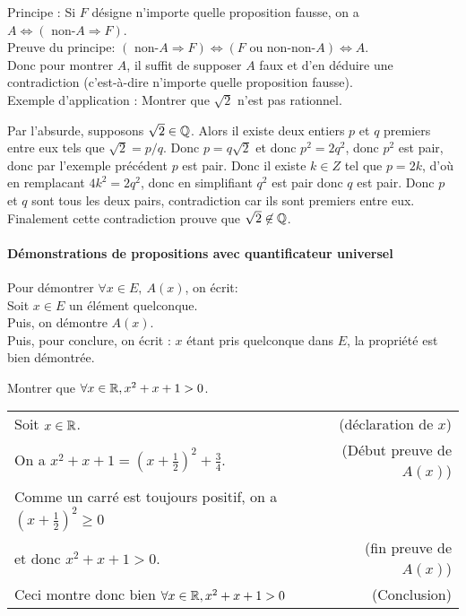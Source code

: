 {Principe : Si $F$ désigne n'importe quelle proposition fausse, on a $A \Leftrightarrow (\text{ non-}A \Rightarrow F)$.\\
Preuve du principe: $(\text{ non-}A \Rightarrow F) \Leftrightarrow (F\text{ ou non-non-}A)\Leftrightarrow A$.\\
 Donc pour montrer $A$, il suffit de supposer $A$ faux et d'en déduire une contradiction (c'est-à-dire n'importe quelle proposition fausse).\\
Exemple d'application : Montrer que $\sqrt{2}$ n'est pas rationnel.
\begin{red}
Par l'absurde, supposons $\sqrt{2}\in\mathbb{Q}$. Alors il existe deux entiers $p$ et $q$ premiers entre eux tels que $\sqrt{2} = p/q$. Donc $p = q\sqrt{2}$ et donc $p^2 = 2 q^2$, donc $p^2$ est pair, donc par l'exemple précédent $p$ est pair. Donc il existe $k\in Z$ tel que $p = 2k$, d'où en remplacant $4k^2 = 2 q^2$, donc en simplifiant $q^2$ est pair donc $q$ est pair. Donc $p$ et $q$ sont tous les deux pairs, contradiction car ils sont premiers entre eux. Finalement cette contradiction prouve que $\sqrt{2} \not\in \mathbb{Q}$.
\end{red}

\paragraph{Démonstrations de propositions avec quantificateur universel}$ $\\

Pour démontrer $\forall x\in E,\:A(x)$, on écrit:\\
\og Soit $x\in E$ un élément quelconque\fg.\\
Puis, on démontre $A(x)$.\\
Puis, pour conclure, on écrit : \og $x$ étant pris quelconque dans $E$, la propriété est bien démontrée\fg.\\


\begin{exemple}
Montrer que $\forall x\in \mathbb{R}, x^2+x+1> 0$\fg.
\begin{red}
\begin{tabular}{lr}
Soit $x\in \mathbb{R}$. & (déclaration de $x$)\\
On a $x^2+x+1 = (x+\frac12)^2+\frac34$. & (Début preuve de $A(x)$)\\
Comme un carré est toujours positif, on a $(x+\frac12)^2 \geq 0$ & \\
 et donc  $x^2+x+1>0$. & (fin preuve de $A(x)$)\\
Ceci montre donc bien $\forall x\in \mathbb{R}, x^2+x+1>0$ & (Conclusion)\\
\end{tabular}
\end{red}
\end{exemple}


}
